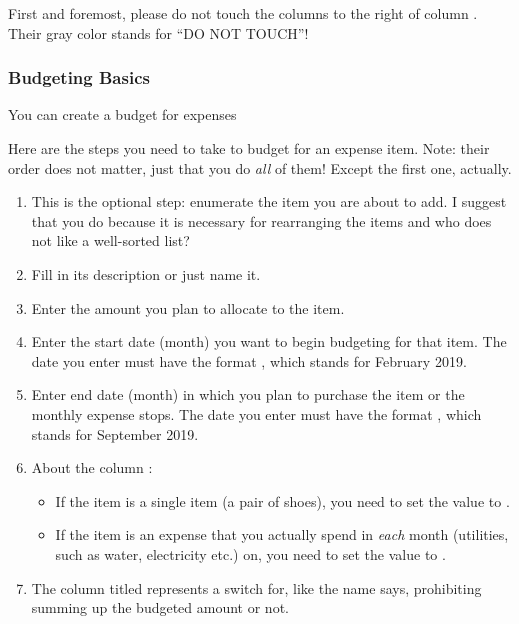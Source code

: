 First and foremost, please do not touch the columns to the right of column .
Their gray color stands for ``DO NOT TOUCH''!

\subsubsection{Budgeting Basics}
\label{subsubsec:budgeting-basics}

You can create a budget for expenses

Here are the steps you need to take to budget for an expense item.
Note: their order does not matter, just that you do \emph{all} of them!
Except the first one, actually.
\begin{enumerate}
	\item This is the optional step: enumerate the item you are about to add.
	I suggest that you do because it is necessary for rearranging the items and who does not like a well-sorted list?
	\item Fill in its description or just name it.
	\item Enter the amount you plan to allocate to the item.
	\item Enter the start date (\ie month) you want to begin budgeting for that item.
	The date you enter must have the format , \eg {} which stands for February 2019.
	\item Enter end date (\ie month) in which you plan to purchase the item or the monthly expense stops.
	The date you enter must have the format , \eg {} which stands for September 2019.
	\item About the column :
	\begin{itemize}
		\item If the item is a single item (\eg a pair of shoes), you need to set the value to .
		\item If the item is an expense that you actually spend in \emph{each} month (\eg utilities, such as water, electricity etc.) on, you need to set the value to .
	\end{itemize}
	\item The column titled  represents a switch for, like the name says, prohibiting summing up the budgeted amount or not.

\end{enumerate}
